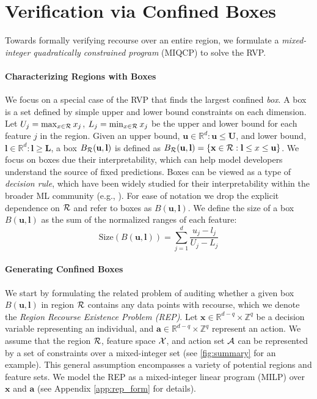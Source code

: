 \section{Verification via Confined Boxes}
\label{sec:method}

Towards formally verifying recourse over an entire region, we formulate a \emph{mixed-integer quadratically constrained program} (MIQCP) to solve the RVP. 

\paragraph{Characterizing Regions with Boxes}
We focus on a special case of the RVP that finds the largest confined \textit{box}. A box is a set defined by simple upper and lower bound constraints on each dimension. Let $U_j = \max_{x \in {\cal R}}x_j$, $L_j = \min_{x \in {\cal R}}x_j$ be the upper and lower bound for each feature $j$ in the region. Given an upper bound, $\mathbf{u} \in \mathbb{R}^d: \mathbf{u} \leq \mathbf{U}$, and lower bound, $\mathbf{l} \in \mathbb{R}^d: \mathbf{l} \geq \mathbf{L}$, a box $B_{\cal R}(\mathbf{u},\mathbf{l})$ is defined as
$
B_{\cal R}(\mathbf{u},\mathbf{l}) = \{\mathbf{x} \in {\cal R}: \mathbf{l} \leq x \leq \mathbf{u}\}
$.
We focus on boxes due their interpretability, which can help model developers understand the source of fixed predictions. Boxes can be viewed as a type of \emph{decision rule}, which have been widely studied for their interpretability within the broader ML community (e.g., \cite{lawless2023interpretable, lawless2022interpretable, lawless2023cluster}). For ease of notation we drop the explicit dependence on ${\cal R}$ and refer to boxes as $B(\mathbf{u}, \mathbf{l})$. We define the size of a box $B(\mathbf{u},\mathbf{l})$ as the sum of the normalized ranges of each feature:%
\vspace{-0.5em}
\begin{equation} \label{def:boxsize}
\text{Size}(B(\mathbf{u}, \mathbf{l})) = \sum_{j=1}^d \frac{u_j - l_j}{U_j - L_j}
\end{equation}

\paragraph{Generating Confined Boxes}
We start by formulating the related problem of auditing whether a given box $B(\mathbf{u}, \mathbf{l})$ in region ${\cal R}$ contains any data points with recourse, which we denote the \emph{Region Recourse Existence Problem (REP)}. Let $\mathbf{x} \in \mathbb{R}^{d-q} \times \mathbb{Z}^q$ be a decision variable representing an individual, and $\mathbf{a} \in \mathbb{R}^{d-q} \times \mathbb{Z}^q$ represent an action. We assume that the region ${\cal R}$, feature space ${\cal X}$, and action set ${\cal A}$ can be represented by a set of constraints over a mixed-integer set (see \cref{fig:summary} for an example). This general assumption encompasses a variety of potential regions and feature sets. We model the REP as a mixed-integer linear program (MILP) over $\mathbf{x}$ and $\mathbf{a}$ (see Appendix \ref{app:rep_form} for details). 

